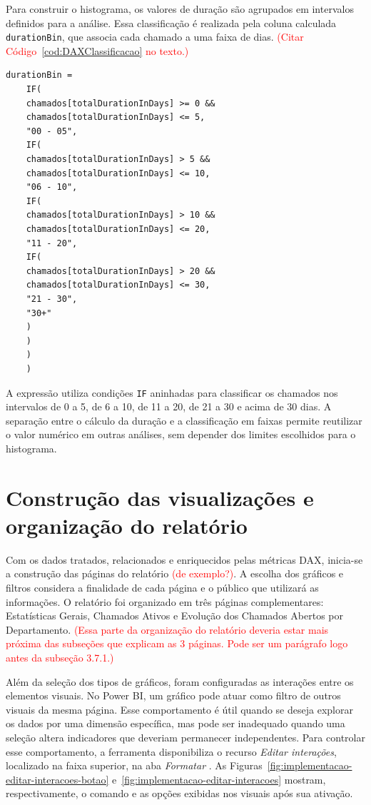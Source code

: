 Para construir o histograma, os valores de duração são agrupados em intervalos definidos para a análise. Essa classificação é realizada pela coluna calculada \texttt{durationBin}, que associa cada chamado a uma faixa de dias.  \textcolor{red}{(Citar Código~\ref{cod:DAXClassificacao} no texto.)}\\

\begin{lstlisting}[caption={Código DAX para classificação dos chamados por faixa de duração.}, label = {cod:DAXClassificacao}]
	durationBin =
	IF(
	chamados[totalDurationInDays] >= 0 &&
	chamados[totalDurationInDays] <= 5,
	"00 - 05",
	IF(
	chamados[totalDurationInDays] > 5 &&
	chamados[totalDurationInDays] <= 10,
	"06 - 10",
	IF(
	chamados[totalDurationInDays] > 10 &&
	chamados[totalDurationInDays] <= 20,
	"11 - 20",
	IF(
	chamados[totalDurationInDays] > 20 &&
	chamados[totalDurationInDays] <= 30,
	"21 - 30",
	"30+"
	)
	)
	)
	)
\end{lstlisting}


A expressão utiliza condições \texttt{IF} aninhadas para classificar os chamados nos intervalos de 0 a 5, de 6 a 10, de 11 a 20, de 21 a 30 e acima de 30 dias. A separação entre o cálculo da duração e a classificação em faixas permite reutilizar o valor numérico em outras análises, sem depender dos limites escolhidos para o histograma.


\section{Construção das visualizações e organização do relatório}

Com os dados tratados, relacionados e enriquecidos pelas métricas DAX, inicia-se a construção das páginas do relatório  \textcolor{red}{(de exemplo?)}. A escolha dos gráficos e filtros considera a finalidade de cada página e o público que utilizará as informações. O relatório foi organizado em três páginas complementares: Estatísticas Gerais, Chamados Ativos e Evolução dos Chamados Abertos por Departamento. \textcolor{red}{(Essa parte da organização do relatório deveria estar mais próxima das subseções que explicam as 3 páginas. Pode ser um  parágrafo logo antes da subseção 3.7.1.)}

Além da seleção dos tipos de gráficos, foram configuradas as interações entre os elementos visuais. No Power BI, um gráfico pode atuar como filtro de outros visuais da mesma página. Esse comportamento é útil quando se deseja explorar os dados por uma dimensão específica, mas pode ser inadequado quando uma seleção altera indicadores que deveriam permanecer independentes. Para controlar esse comportamento, a ferramenta disponibiliza o recurso \textit{Editar interações}, localizado na faixa superior, na aba \textit{Formatar} \cite{Editar_Interacoes}. As Figuras~\ref{fig:implementacao-editar-interacoes-botao} e~\ref{fig:implementacao-editar-interacoes} mostram, respectivamente, o comando e as opções exibidas nos visuais após sua ativação.


